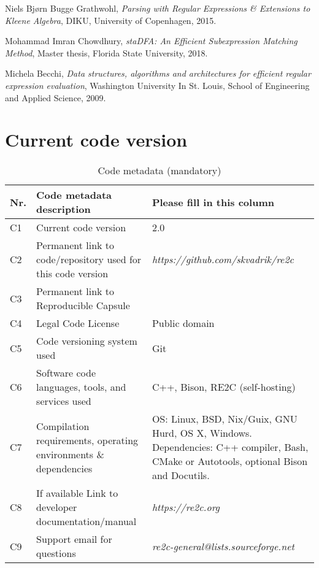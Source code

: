 \documentclass[preprint,12pt, a4paper]{elsarticle}
\begin{document}
\begin{thebibliography}{00}
    Niels Bj{\o}rn Bugge Grathwohl,
    \textit{Parsing with Regular Expressions \& Extensions to Kleene Algebra},
    DIKU, University of Copenhagen,
    2015.

    Mohammad Imran Chowdhury,
    \textit{staDFA: An Efficient Subexpression Matching Method},
    Master thesis,
    Florida State University,
    2018.

    Michela Becchi,
    \textit{Data structures, algorithms and architectures for efficient regular expression evaluation},
    Washington University In St. Louis, School of Engineering and Applied Science,
    2009.

\end{thebibliography}

\vfill\null
\clearpage

\section*{Current code version}
\label{}

\begin{table}[!h]
\begin{tabular}{|l|p{6.5cm}|p{6.5cm}|}
\hline
\textbf{Nr.} & \textbf{Code metadata description} & \textbf{Please fill in this column} \\
\hline
C1 & Current code version & 2.0 \\
\hline
C2 & Permanent link to code/repository used for this code version &
    \textit{https://github.com/skvadrik/re2c} \\
\hline
C3  & Permanent link to Reproducible Capsule & \\
\hline
C4 & Legal Code License   & Public domain \\
\hline
C5 & Code versioning system used & Git \\
\hline
C6 & Software code languages, tools, and services used & C++, Bison, RE2C (self-hosting) \\
\hline
C7 & Compilation requirements, operating environments \& dependencies &
    OS: Linux, BSD, Nix/Guix, GNU Hurd, OS X, Windows.
    Dependencies: C++ compiler, Bash, CMake or Autotools, optional Bison and Docutils. \\
\hline
C8 & If available Link to developer documentation/manual & \textit{https://re2c.org} \\
\hline
C9 & Support email for questions & \textit{re2c-general@lists.sourceforge.net} \\
\hline
\end{tabular}
\caption{Code metadata (mandatory)}
\label{} 
\end{table}
\end{document}
